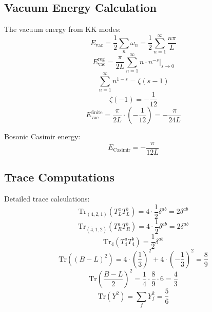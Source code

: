 \documentclass[11pt,a4paper]{article}
\begin{document}
\subsection*{Vacuum Energy Calculation}
\label{subsec:vac-energy}

The vacuum energy from KK modes:
\begin{equation}
\label{eq:ext-vac-1}
E_{\text{vac}} = \frac{1}{2}\sum_n \omega_n = \frac{1}{2}\sum_{n=1}^{\infty} \frac{n\pi}{L}
\end{equation}
\begin{equation}
\label{eq:ext-vac-2}
E_{\text{vac}}^{\text{reg}} = \frac{\pi}{2L}\sum_{n=1}^{\infty} n \cdot n^{-s}\Big|_{s\to 0}
\end{equation}
\begin{equation}
\label{eq:ext-vac-3}
\sum_{n=1}^{\infty} n^{1-s} = \zeta(s-1)
\end{equation}
\begin{equation}
\label{eq:ext-vac-4}
\zeta(-1) = -\frac{1}{12}
\end{equation}
\begin{equation}
\label{eq:ext-vac-5}
E_{\text{vac}}^{\text{finite}} = \frac{\pi}{2L} \cdot \left(-\frac{1}{12}\right) = -\frac{\pi}{24L}
\end{equation}

Bosonic Casimir energy:
\begin{equation}
\label{eq:ext-vac-6}
E_{\text{Casimir}} = -\frac{\pi}{12L}
\end{equation}

\subsection*{Trace Computations}
\label{subsec:trace-comp}

Detailed trace calculations:
\begin{equation}
\label{eq:ext-tr-1}
\text{Tr}_{(4,2,1)}(T_L^a T_L^b) = 4 \cdot \frac{1}{2}\delta^{ab} = 2\delta^{ab}
\end{equation}
\begin{equation}
\label{eq:ext-tr-2}
\text{Tr}_{(\bar{4},1,2)}(T_R^a T_R^b) = 4 \cdot \frac{1}{2}\delta^{ab} = 2\delta^{ab}
\end{equation}
\begin{equation}
\label{eq:ext-tr-3}
\text{Tr}_{4}(T_4^a T_4^b) = \frac{1}{2}\delta^{ab}
\end{equation}
\begin{equation}
\label{eq:ext-tr-4}
\text{Tr}((B-L)^2) = 4 \cdot \left(\frac{1}{3}\right)^2 + 4 \cdot \left(-\frac{1}{3}\right)^2 = \frac{8}{9}
\end{equation}
\begin{equation}
\label{eq:ext-tr-5}
\text{Tr}\left(\frac{B-L}{2}\right)^2 = \frac{1}{4} \cdot \frac{8}{9} \cdot 6 = \frac{4}{3}
\end{equation}
\begin{equation}
\label{eq:ext-tr-6}
\text{Tr}(Y^2) = \sum_f Y_f^2 = \frac{5}{6}
\end{equation}
\end{document}

